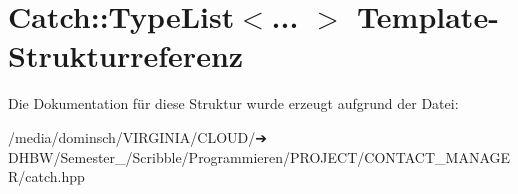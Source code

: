 \hypertarget{structCatch_1_1TypeList}{}\section{Catch\+:\+:Type\+List$<$... $>$ Template-\/\+Strukturreferenz}
\label{structCatch_1_1TypeList}


Die Dokumentation für diese Struktur wurde erzeugt aufgrund der Datei\+:\begin{DoxyCompactItemize}
\item 
/media/dominsch/\+V\+I\+R\+G\+I\+N\+I\+A/\+C\+L\+O\+U\+D/➔ D\+H\+B\+W/\+Semester\+\_/\+Scribble/\+Programmieren/\+P\+R\+O\+J\+E\+C\+T/\+C\+O\+N\+T\+A\+C\+T\+\_\+\+M\+A\+N\+A\+G\+E\+R/catch.\+hpp\end{DoxyCompactItemize}
